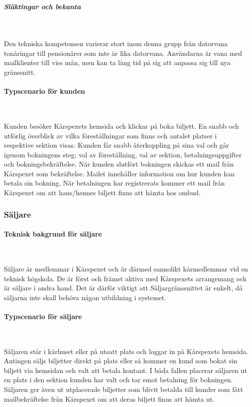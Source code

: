 \documentclass[a4paper, twoside, 11pt, titlepage]{article}
\begin{document}
			\subparagraph{\emph{Släktingar och bekanta}}\

				Den tekniska kompetensen varierar stort inom denna grupp från datorvana tonåringar till pensionärer som inte är lika datorvana. Användarna är vana med mailklienter till viss mån, men kan ta lång tid på sig att anpassa sig till nya gränssnitt.

			\paragraph{Typscenario för kunden}\

			Kunden besöker Kårspexets hemsida och klickar på boka biljett. En snabb och utförlig överblick av vilka föreställningar som finns och antalet platser i respektive sektion visas. Kunden får snabb återkoppling på sina val och går igenom bokningens steg; val av föreställning, val av sektion, betalningsuppgifter och bokningsbekräftelse. När kunden slutfört bokningen skickas ett mail från Kårspexet som bekräftelse. Mailet innehåller information om hur kunden kan betala sin bokning. När betalningen har registrerats kommer ett mail från Kårspexet om att hans/hennes biljett finns att hämta hos ombud.

		\subsubsection{Säljare}



			\paragraph{Teknisk bakgrund för säljare}\

			Säljare är medlemmar i Kårspexet och är därmed sannolikt kårmedlemmar vid en teknisk högskola. De är först och främst aktiva med Kårspexets arrangemang och är säljare i andra hand. Det är därför viktigt att Säljargränssnittet är enkelt, då säljarna inte skall behöva någon utbildning i systemet.

			\paragraph{Typscenario för säljare}\

			Säljaren står i kårhuset eller på utsatt plats och loggar in på Kårspexets hemsida. Antingen säljs biljetter direkt på plats eller så kommer en kund som bokat sin biljett via hemsidan och valt att betala kontant. I båda fallen placerar säljaren ut en plats i den sektion kunden har valt och tar emot betalning för bokningen. Säljaren ger även ut utplacerade biljetter som blivit betalda till kunder som fått mailbekräftelse från Kårspexet om att deras biljett finns att hämta ut.
\end{document}
